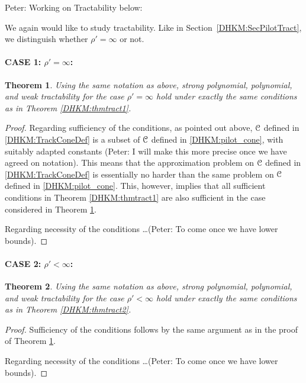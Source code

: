 \documentclass[USenglish]{article}
\theoremstyle{dgthm}
\newtheorem{theorem}{Theorem}
\theoremstyle{dgthm}
\theoremstyle{dgthm}
\theoremstyle{dgthm}
\theoremstyle{dgdef}
\theoremstyle{definition}
\newcommand{\PeterNote}[1]{{\color{orange}Peter: #1}}
\begin{document}
\PeterNote{Working on Tractability below:

\bigskip

We again would like to study tractability. Like in Section~\ref{DHKM:SecPilotTract}, we distinguish whether $\rho'=\infty$ or not. 

\paragraph*{CASE 1: $\rho'=\infty$:}

\begin{theorem} \label{DHKM:thmtract3}
Using the same notation as above, strong polynomial, polynomial, and weak tractability for the case $\rho'=\infty$ hold under exactly the 
same conditions as in Theorem \ref{DHKM:thmtract1}.
\end{theorem}
\begin{proof}

Regarding sufficiency of the conditions, as pointed out above, ${\mathcal{C}}$ defined in \eqref{DHKM:TrackConeDef} is a subset of  ${\mathcal{C}}$ defined in \eqref{DHKM:pilot_cone}, with suitably adapted constants (\PeterNote{I will make this more precise once we have agreed on notation}). This means that the approximation problem on  ${\mathcal{C}}$ defined in \eqref{DHKM:TrackConeDef} is essentially no harder than the same problem on ${\mathcal{C}}$ defined in \eqref{DHKM:pilot_cone}. This, however, implies that all sufficient conditions in Theorem \ref{DHKM:thmtract1} are also sufficient in the case considered in Theorem \ref{DHKM:thmtract3}.

\medskip

Regarding necessity of the conditions \ldots (\PeterNote{To come once we have lower bounds}).

\end{proof}


\paragraph*{CASE 2: $\rho'<\infty$:} 

\begin{theorem} \label{DHKM:thmtract4}
Using the same notation as above, strong polynomial, polynomial, and weak tractability for the case $\rho'<\infty$ hold under exactly the 
same conditions as in Theorem \ref{DHKM:thmtract2}.
\end{theorem}
\begin{proof}
Sufficiency of the conditions follows by the same argument as in the proof of Theorem \ref{DHKM:thmtract3}.

\medskip

Regarding necessity of the conditions \ldots (\PeterNote{To come once we have lower bounds}).

\end{proof}

}
\end{document}
